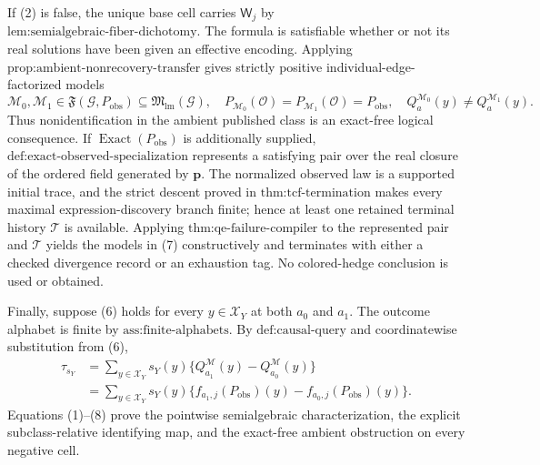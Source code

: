 If (2) is false, the unique base cell carries \(\mathsf W_j\) by \(\text{lem:semialgebraic-fiber-dichotomy}\). The formula is satisfiable whether or not its real solutions have been given an effective encoding. Applying \(\text{prop:ambient-nonrecovery-transfer}\) gives strictly positive individual-edge-factorized models
\[
\mathcal M_0,\mathcal M_1\in\mathfrak F(\mathcal G,P_{\mathrm{obs}})
\subseteq\mathfrak M_{\mathrm{lm}}(\mathcal G),
\quad
P_{\mathcal M_0}(\mathcal O)=P_{\mathcal M_1}(\mathcal O)=P_{\mathrm{obs}},
\quad
Q_a^{\mathcal M_0}(y)\neq Q_a^{\mathcal M_1}(y).
\tag{7}
\]
Thus nonidentification in the ambient published class is an exact-free logical consequence. If \(\operatorname{Exact}(P_{\mathrm{obs}})\) is additionally supplied, \(\text{def:exact-observed-specialization}\) represents a satisfying pair over the real closure of the ordered field generated by \(\mathbf p\). The normalized observed law is a supported initial trace, and the strict descent proved in \(\text{thm:tcf-termination}\) makes every maximal expression-discovery branch finite; hence at least one retained terminal history \(\mathcal T\) is available. Applying \(\text{thm:qe-failure-compiler}\) to the represented pair and \(\mathcal T\) yields the models in (7) constructively and terminates with either a checked divergence record or an exhaustion tag. No colored-hedge conclusion is used or obtained.

Finally, suppose (6) holds for every \(y\in\mathcal X_Y\) at both \(a_0\) and \(a_1\). The outcome alphabet is finite by \(\text{ass:finite-alphabets}\). By \(\text{def:causal-query}\) and coordinatewise substitution from (6),
\[
\begin{aligned}
\tau_{s_Y}
&=\sum_{y\in\mathcal X_Y}s_Y(y)
\{Q_{a_1}^{\mathcal M}(y)-Q_{a_0}^{\mathcal M}(y)\}\\
&=\sum_{y\in\mathcal X_Y}s_Y(y)
\{f_{a_1,j}(P_{\mathrm{obs}})(y)-f_{a_0,j}(P_{\mathrm{obs}})(y)\}.
\end{aligned}
\tag{8}
\]
Equations (1)--(8) prove the pointwise semialgebraic characterization, the explicit subclass-relative identifying map, and the exact-free ambient obstruction on every negative cell.